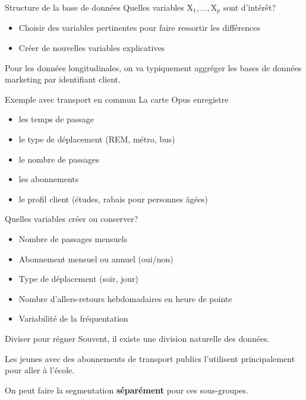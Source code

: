 \documentclass[
  ignorenonframetext,
]{beamer}
\providecommand{\tightlist}{%
  \setlength{\itemsep}{0pt}\setlength{\parskip}{0pt}}\usepackage{longtable,booktabs,array}
\begin{document}
\begin{frame}{Structure de la base de données}
\protect\hypertarget{structure-de-la-base-de-donnuxe9es}{}
Quelles variables \(\mathrm{X}_1, \ldots, \mathrm{X}_p\) sont d'intérêt?

\begin{itemize}
\tightlist
\item
  Choisir des variables pertinentes pour faire ressortir les différences
\item
  Créer de nouvelles variables explicatives
\end{itemize}

Pour les données longitudinales, on va typiquement aggréger les bases de
données marketing par identifiant client.
\end{frame}

\begin{frame}{Exemple avec transport en commun}
\protect\hypertarget{exemple-avec-transport-en-commun}{}
La carte Opus enregistre

\begin{itemize}
\tightlist
\item
  les temps de passage
\item
  le type de déplacement (REM, métro, bus)
\item
  le nombre de passages
\item
  les abonnements
\item
  le profil client (études, rabais pour personnes âgées)
\end{itemize}
\end{frame}

\begin{frame}{Quelles variables créer ou conserver?}
\protect\hypertarget{quelles-variables-cruxe9er-ou-conserver}{}
\begin{itemize}
\tightlist
\item
  Nombre de passages mensuels
\item
  Abonnement mensuel ou annuel (oui/non)
\item
  Type de déplacement (soir, jour)
\item
  Nombre d'allers-retours hebdomadaires en heure de pointe
\item
  Variabilité de la fréquentation
\end{itemize}
\end{frame}

\begin{frame}{Diviser pour régner}
\protect\hypertarget{diviser-pour-ruxe9gner}{}
Souvent, il existe une division naturelle des données.

Les jeunes avec des abonnements de transport publics l'utilisent
principalement pour aller à l'école.

On peut faire la segmentation \textbf{séparément} pour ces sous-groupes.
\end{frame}
\end{document}
